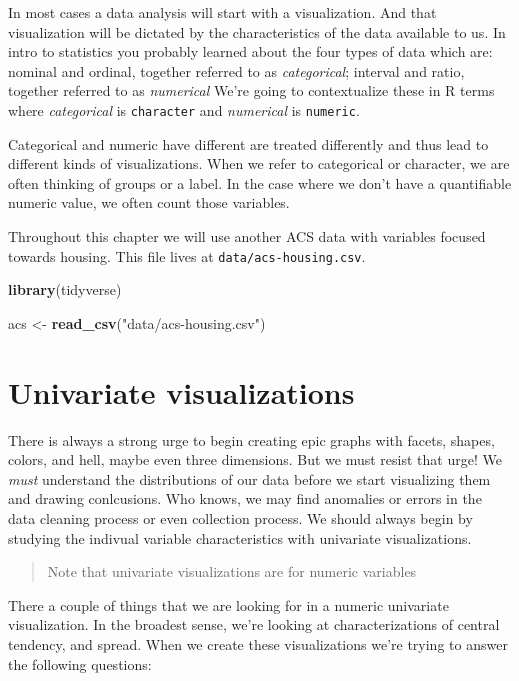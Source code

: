 \documentclass[
]{book}
\newenvironment{Shaded}{\begin{snugshade}}{\end{snugshade}}
\newcommand{\KeywordTok}[1]{\textcolor[rgb]{0.13,0.29,0.53}{\textbf{#1}}}
\newcommand{\NormalTok}[1]{#1}
\newcommand{\StringTok}[1]{\textcolor[rgb]{0.31,0.60,0.02}{#1}}
\begin{document}
In most cases a data analysis will start with a visualization. And that visualization will be dictated by the characteristics of the data available to us. In intro to statistics you probably learned about the four types of data which are: nominal and ordinal, together referred to as \emph{categorical}; interval and ratio, together referred to as \emph{numerical} We're going to contextualize these in R terms where \emph{categorical} is \texttt{character} and \emph{numerical} is \texttt{numeric}.

Categorical and numeric have different are treated differently and thus lead to different kinds of visualizations. When we refer to categorical or character, we are often thinking of groups or a label. In the case where we don't have a quantifiable numeric value, we often count those variables.

Throughout this chapter we will use another ACS data with variables focused towards housing. This file lives at \texttt{data/acs-housing.csv}.

\begin{Shaded}
\begin{Highlighting}[]
\KeywordTok{library}\NormalTok{(tidyverse)}

\NormalTok{acs \textless{}{-}}\StringTok{ }\KeywordTok{read\_csv}\NormalTok{(}\StringTok{"data/acs{-}housing.csv"}\NormalTok{)}
\end{Highlighting}
\end{Shaded}

\hypertarget{univariate-visualizations}{%
\section{Univariate visualizations}\label{univariate-visualizations}}

There is always a strong urge to begin creating epic graphs with facets, shapes, colors, and hell, maybe even three dimensions. But we must resist that urge! We \emph{must} understand the distributions of our data before we start visualizing them and drawing conlcusions. Who knows, we may find anomalies or errors in the data cleaning process or even collection process. We should always begin by studying the indivual variable characteristics with univariate visualizations.

\begin{quote}
Note that univariate visualizations are for numeric variables
\end{quote}

There a couple of things that we are looking for in a numeric univariate visualization. In the broadest sense, we're looking at characterizations of central tendency, and spread. When we create these visualizations we're trying to answer the following questions:
\end{document}
